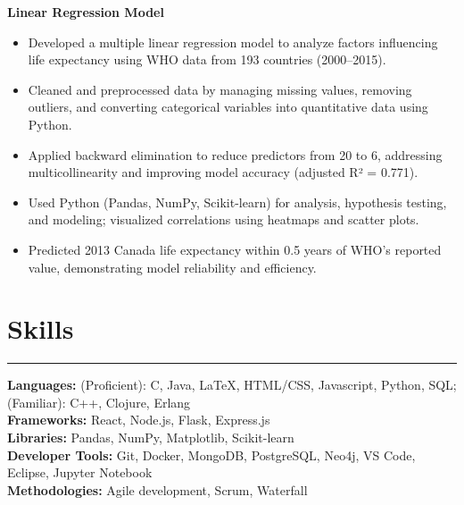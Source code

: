 \documentclass[10pt]{article}
\begin{document}
\textbf{Linear Regression Model} 
\vspace{-4mm}
\begin{itemize}[left=0.15in, itemsep=0pt, label=--]
    \item Developed a multiple linear regression model to analyze factors influencing life expectancy using WHO data from 193 countries (2000–2015).
    \item Cleaned and preprocessed data by managing missing values, removing outliers, and converting categorical variables into quantitative data using Python.
    \item Applied backward elimination to reduce predictors from 20 to 6, addressing multicollinearity and improving model accuracy (adjusted R² = 0.771).
    \item Used Python (Pandas, NumPy, Scikit-learn) for analysis, hypothesis testing, and modeling; visualized correlations using heatmaps and scatter plots.
    \item Predicted 2013 Canada life expectancy within 0.5 years of WHO’s reported value, demonstrating model reliability and efficiency.
\end{itemize}

\vspace{-6mm} %
\section*{Skills}
\vspace{-2mm}
\hrule
\vspace{0mm}
\textbf{Languages:} (Proficient): C, Java, LaTeX, HTML/CSS, Javascript, Python, SQL; (Familiar): C++, Clojure, Erlang \\
\textbf{Frameworks:} React, Node.js, Flask, Express.js  \\
\textbf{Libraries:} Pandas, NumPy, Matplotlib, Scikit-learn \\
\textbf{Developer Tools:} Git, Docker, MongoDB, PostgreSQL, Neo4j, VS Code, Eclipse, Jupyter Notebook \\
\textbf{Methodologies:} Agile development, Scrum, Waterfall
\end{document}

